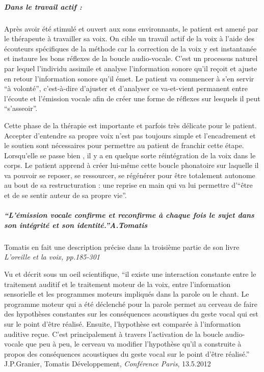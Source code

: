 \documentclass[12pt,french]{report}
\makeatletter
\let\SF@@footnote\footnote
\def\footnote{\ifx\protect\@typeset@protect
    \expandafter\SF@@footnote
  \else
    \expandafter\SF@gobble@opt
  \fi
}
\edef\SF@gobble@opt{\noexpand\protect
  \expandafter\noexpand\csname SF@gobble@opt \endcsname}
\makeatother
\begin{document}
\subparagraph{Dans le travail actif :}

Après avoir été stimulé et ouvert aux sons environnants, le patient
est amené par le thérapeute à travailler sa voix. On cible un travail
actif de la voix à l'aide des écouteurs spécifiques de la méthode
car la correction de la voix y est instantanée et instaure les bons
réflexes de la boucle audio-vocale. C'est un processus naturel par
lequel l'individu assimile et analyse l'information sonore qu'il reçoit
et ajuste en retour l'information sonore qu'il émet. Le patient va
commencer à s'en servir ``à volonté'', c'est-à-dire d'ajuster et
d'analyser ce va-et-vient permanent entre l'écoute et l'émission vocale
afin de créer une forme de réflexes sur lesquels il peut ``s'asseoir''. 

Cette phase de la thérapie est importante et parfois très délicate
pour le patient. Accepter d'entendre sa propre voix n'est pas toujours
simple et l'encadrement et le soutien sont nécessaires pour permettre
au patient de franchir cette étape. Lorsqu'elle se passe bien , il
y a en quelque sorte réintégration de la voix dans le corps. Le patient
apprend à créer lui-même cette boucle phonatoire sur laquelle il va
pouvoir se reposer, se ressourcer, se régénérer pour être totalement
autonome au bout de sa restructuration : une reprise en main qui va
lui permettre d'``être et de se sentir auteur de sa propre vie''. 

\subparagraph{\textmd{\emph{``L'émission vocale confirme et reconfirme à chaque
fois le sujet dans son intégrité et son identité.''A.Tomatis}}}

\footnote{Tomatis en fait une description précise dans la troisième partie de
son livre\emph{ L'oreille et la voix, pp.185-301}}

Vu et décrit sous un oeil scientifique, ``il existe une interaction
constante entre le traitement auditif et le traitement moteur de la
voix, entre l'information sensorielle et les programmes moteurs impliqués
dans la parole ou le chant. Le programme moteur qui a été déclenché
pour la parole permet au cerveau de faire des hypothèses constantes
sur les conséquences acoustiques du geste vocal qui est sur le point
d'être réalisé. Ensuite, l'hypothèse est comparée à l'information
auditive reçue. C'est principalement à travers l'activation de la
boucle audio-vocale que peu à peu, le cerveau va modifier l'hypothèse
qu'il a construite à propos des conséquences acoustiques du geste
vocal sur le point d'être réalisé.'' \footnote{J.P.Granier, Tomatis Développement,\emph{ Conférence Paris}, 13.5.2012}
\end{document}
